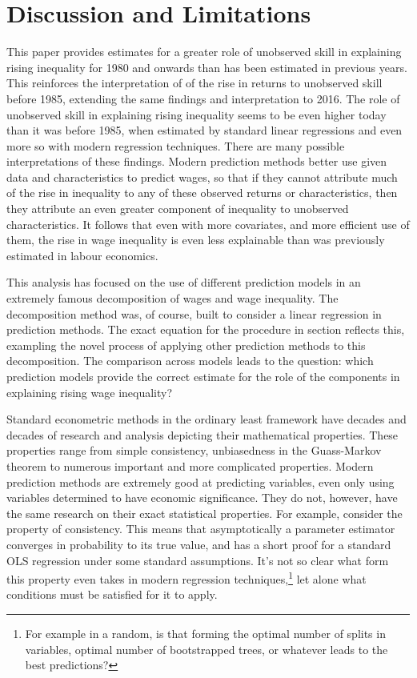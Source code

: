 \documentclass[notitlepage,12pt]{article}
\begin{document}
\section{Discussion and Limitations}

This paper provides estimates for a greater role of unobserved skill in explaining rising inequality for 1980 and onwards than has been estimated in previous years.  This reinforces the interpretation of \cite{juhn1993wage} of the rise in returns to unobserved skill before 1985, extending the same findings and interpretation to 2016.  The role of unobserved skill in explaining rising inequality seems to be even higher today than it was before 1985, when estimated by standard linear regressions and even more so with modern regression techniques.  There are many possible interpretations of these findings.  Modern prediction methods better use given data and characteristics to predict wages, so that if they cannot attribute much of the rise in inequality to any of these observed returns or characteristics, then they attribute an even greater component of inequality to unobserved characteristics.  It follows that even with more covariates, and more efficient use of them, the rise in wage inequality is even less explainable than was previously estimated in labour economics.

This analysis has focused on the use of different prediction models in an extremely famous decomposition of wages and wage inequality.  The decomposition method was, of course, built to consider a linear regression in prediction methods.  The exact equation for the procedure in section reflects this, exampling the novel process of applying other prediction methods to this decomposition.  The comparison across models leads to the question: which prediction models provide the correct estimate for the role of the components in explaining rising wage inequality? 


Standard econometric methods in the ordinary least framework have decades and decades of research and analysis depicting their mathematical properties.  These properties range from simple consistency, unbiasedness in the Guass-Markov theorem to numerous important and more complicated properties.  Modern prediction methods are extremely good at predicting variables, even only using variables determined to have economic significance.  They do not, however, have the same research on their exact statistical properties.  For example, consider the property of consistency.  This means that asymptotically a parameter estimator converges in probability  to its true value, and has a short proof for a standard OLS regression under some standard assumptions.  It's not so clear what form this property even takes in modern regression techniques,\footnote{For example in a random, is that forming the optimal number of splits in variables, optimal number of bootstrapped trees, or whatever leads to the best predictions?} let alone what conditions must be satisfied for it to apply.
\end{document}
